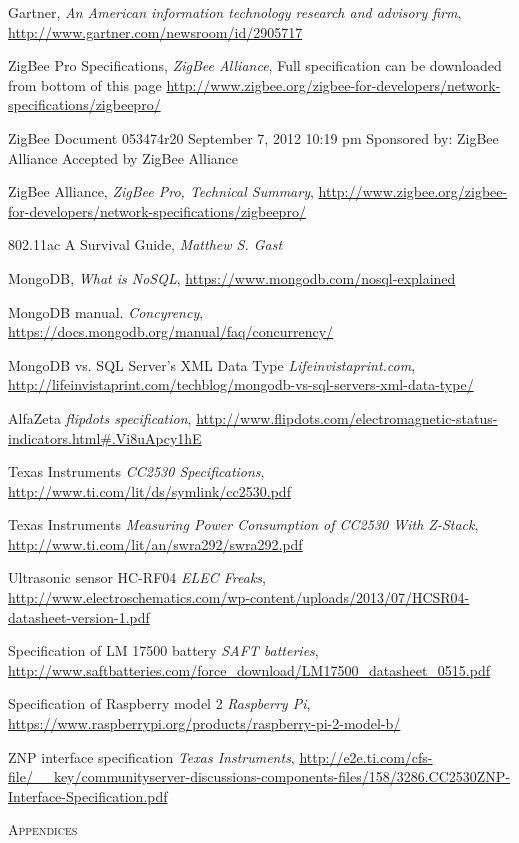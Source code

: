 \documentclass[a4paper,12pt,english]{article}
\begin{document}
\begin{thebibliography}{9}


  Gartner,
  \emph{ An American information technology research and advisory
  firm}, \url{http://www.gartner.com/newsroom/id/2905717}

ZigBee Pro Specifications,
\emph{ZigBee Alliance},
Full specification can
be downloaded from
bottom of this page
\url{http://www.zigbee.org/zigbee-for-developers/network-specifications/zigbeepro/}

ZigBee Document 053474r20
September 7, 2012 10:19 pm
Sponsored by: ZigBee Alliance
Accepted by ZigBee Alliance

ZigBee Alliance,
\emph{ZigBee Pro, Technical Summary},
\url{http://www.zigbee.org/zigbee-for-developers/network-specifications/zigbeepro/}

802.11ac A Survival Guide,
\emph{Matthew S. Gast}


MongoDB,
\emph{What is NoSQL},
\url{https://www.mongodb.com/nosql-explained}

MongoDB manual.
\emph{Concyrency},
\url{https://docs.mongodb.org/manual/faq/concurrency/}

MongoDB vs. SQL Server’s XML Data Type
\emph{Lifeinvistaprint.com},
\url{http://lifeinvistaprint.com/techblog/mongodb-vs-sql-servers-xml-data-type/}

AlfaZeta
\emph{flipdots specification},
\url{http://www.flipdots.com/electromagnetic-status-indicators.html#.Vi8uApcy1hE}

Texas Instruments
\emph{CC2530 Specifications},
\url{http://www.ti.com/lit/ds/symlink/cc2530.pdf}

Texas Instruments
\emph{Measuring Power Consumption of CC2530 With Z-Stack},
\url{http://www.ti.com/lit/an/swra292/swra292.pdf}

Ultrasonic sensor HC-RF04
\emph{ELEC Freaks},
\url{http://www.electroschematics.com/wp-content/uploads/2013/07/HCSR04-datasheet-version-1.pdf}

Specification of LM 17500 battery
\emph{SAFT batteries},
\url{http://www.saftbatteries.com/force_download/LM17500_datasheet_0515.pdf}

Specification of Raspberry model 2
\emph{Raspberry Pi},
\url{https://www.raspberrypi.org/products/raspberry-pi-2-model-b/}

ZNP interface specification
\emph{Texas Instruments},
\url{http://e2e.ti.com/cfs-file/__key/communityserver-discussions-components-files/158/3286.CC2530ZNP-Interface-Specification.pdf}


\end{thebibliography}


\clearpage
\textsc{\huge Appendices}
\appendix
\end{document}

